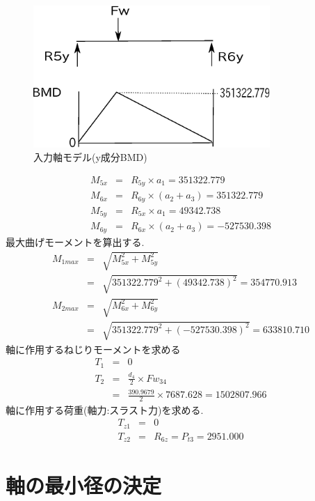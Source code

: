 \begin{figure}[htbp]
\begin{center}
\includegraphics[width=9cm]{../picture/jiku332.eps}
\end{center}
\caption{入力軸モデル(y成分BMD)}
\end{figure}
\begin{eqnarray}
M_{5x} &=& R_{5y} \times a_1=351322.779\\
M_{6x} &=& R_{6y} \times (a_2+a_3)=351322.779\\
M_{5y} &=& R_{5x} \times a_1=49342.738\\
M_{6y} &=& R_{6x} \times (a_2+a_3)=-527530.398
\end{eqnarray}
最大曲げモーメントを算出する.
\begin{eqnarray}
M_{1max} &=& \sqrt {M_{5x}^2+M_{5y}^2}\\
         &=& \sqrt {351322.779^2+(49342.738)^2}=354770.913\\
M_{2max} &=& \sqrt {M_{6x}^2+M_{6y}^2}\\
         &=& \sqrt {351322.779^2+(-527530.398)^2}=633810.710
\end{eqnarray}
軸に作用するねじりモーメントを求める
\begin{eqnarray}
T_{1} &=& 0\\
T_{2} &=& \frac{d_4}{2} \times Fw_{34}\\
      &=& \frac{390.9679}{2} \times 7687.628 = 1502807.966
\end{eqnarray}
軸に作用する荷重(軸力:スラスト力)を求める.
\begin{eqnarray}
T_{z1} &=& 0\\
T_{z2} &=& R_{6z} = P_{t3} = 2951.000
\end{eqnarray}

\section{軸の最小径の決定}
